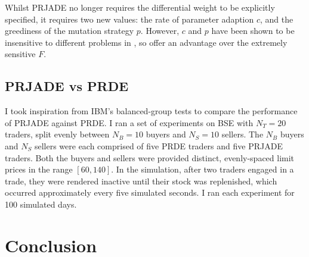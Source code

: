\documentclass[conference]{IEEEtran}
\begin{document}
Whilst PRJADE no longer requires the differential weight to be explicitly specified, it requires two new values: the rate of parameter adaption $c$, and the greediness of the mutation strategy $p$.
However, $c$ and $p$ have been shown to be insensitive to different problems in \cite{ZhangSanderson}, so offer an advantage over the extremely sensitive $F$.

\subsection{PRJADE vs PRDE}

I took inspiration from IBM's balanced-group tests \cite{TesauroDas} to compare the performance of PRJADE against PRDE.
I ran a set of experiments on BSE with $N_T=20$ traders, split evenly between $N_B=10$ buyers and $N_S=10$ sellers.
The $N_B$ buyers and $N_S$ sellers were each comprised of five PRDE traders and five PRJADE traders.
Both the buyers and sellers were provided distinct, evenly-spaced limit prices in the range $[60,140]$.
In the simulation, after two traders engaged in a trade, they were rendered inactive until their stock was replenished, which occurred approximately every five simulated seconds.
I ran each experiment for 100 simulated days.

\section{Conclusion}



\end{document}
